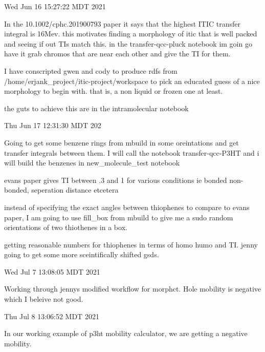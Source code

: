 
Wed Jun 16 15:27:22 MDT 2021
    
       In the 10.1002/cphc.201900793 paper it says that the highest ITIC transfer integral 
       is 16Mev. this motivates finding a morphology of itic that is well packed and 
       seeing if out TIs match this. in the transfer-qcc-pluck notebook im goin go 
       have it grab chromos that are near each other and give the TI for them.
    
        I have conscripted gwen and cody to produce rdfs from /home/erjank_project/itic-project/workspace 
        to pick an educated guess of a nice morphology to begin with. that is, a non liquid or frozen one
        at least.

        the guts to achieve this are in the intramolecular notebook

Thu Jun 17 12:31:30 MDT 202

      Going to get some benzene rings from mbuild in some oreintations and get transfer integrals 
      between them. I will call the notebook transfer-qcc-P3HT and i will build the benzenes in 
      new_molecule_test notebook

      evans paper gives TI between .3 and 1 for various conditions ie bonded non-bonded, seperation
      distance etcetera

      instead of specifying the exact angles between thiophenes to compare to evans paper,
      I am going to use fill_box from mbuild to give me a sudo random orientations of two
      thiothenes in a box.

      getting reasonable numbers for thiophenes in terms of homo humo and TI. jenny going to get
      some more sceintifically shifted gsds.
      

Wed Jul  7 13:08:05 MDT 2021

      Working through jennys modified workflow for morphct. Hole mobility is negative which I beleive
      not good.

Thu Jul  8 13:06:52 MDT 2021
        
     In our working example of p3ht mobility calculator, we are getting a negative mobility. 

